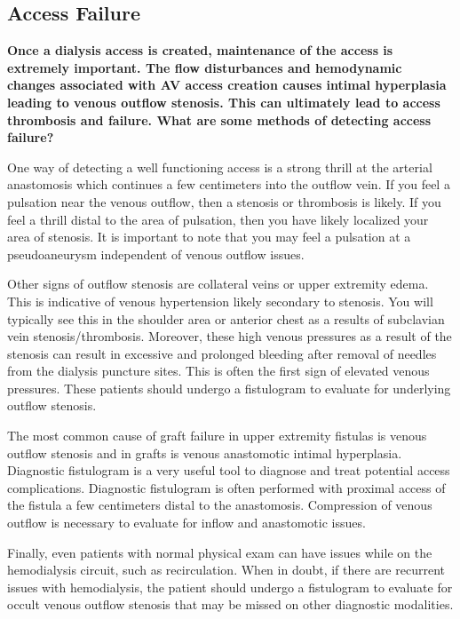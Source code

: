 \documentclass[
]{book}
\begin{document}
\hypertarget{access-failure}{%
\subsection{Access Failure}\label{access-failure}}

\textbf{Once a dialysis access is created, maintenance of the access is
extremely important. The flow disturbances and hemodynamic changes
associated with AV access creation causes intimal hyperplasia leading to
venous outflow stenosis. This can ultimately lead to access thrombosis
and failure. What are some methods of detecting access failure?}

One way of detecting a well functioning access is a strong thrill at the
arterial anastomosis which continues a few centimeters into the outflow
vein. If you feel a pulsation near the venous outflow, then a stenosis
or thrombosis is likely. If you feel a thrill distal to the area of
pulsation, then you have likely localized your area of stenosis. It is
important to note that you may feel a pulsation at a pseudoaneurysm
independent of venous outflow issues.

Other signs of outflow stenosis are collateral veins or upper extremity
edema.\citep{padberg2008} This is indicative of venous hypertension likely
secondary to stenosis. You will typically see this in the shoulder area
or anterior chest as a results of subclavian vein stenosis/thrombosis.
Moreover, these high venous pressures as a result of the stenosis can
result in excessive and prolonged bleeding after removal of needles from
the dialysis puncture sites. This is often the first sign of elevated
venous pressures. These patients should undergo a fistulogram to
evaluate for underlying outflow stenosis.\citep{caromonroig2018}

The most common cause of graft failure in upper extremity fistulas is
venous outflow stenosis and in grafts is venous anastomotic intimal
hyperplasia.\citep{berman2001, padberg2008} Diagnostic fistulogram is a very
useful tool to diagnose and treat potential access complications.
Diagnostic fistulogram is often performed with proximal access of the
fistula a few centimeters distal to the anastomosis. Compression of
venous outflow is necessary to evaluate for inflow and anastomotic
issues.\citep{bountouris2018}

Finally, even patients with normal physical exam can have issues while
on the hemodialysis circuit, such as recirculation. When in doubt, if
there are recurrent issues with hemodialysis, the patient should undergo
a fistulogram to evaluate for occult venous outflow stenosis that may be
missed on other diagnostic modalities.\citep{sidawy2008}
\end{document}
